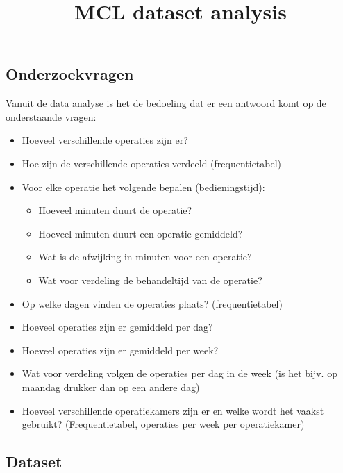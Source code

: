 \documentclass[11pt]{article}
\title{MCL dataset analysis}
\providecommand{\tightlist}{%
      \setlength{\itemsep}{0pt}\setlength{\parskip}{0pt}}
\begin{document}
    
    
    \maketitle
    
    

    
    \hypertarget{onderzoekvragen}{%
\subsection{Onderzoekvragen}\label{onderzoekvragen}}

Vanuit de data analyse is het de bedoeling dat er een antwoord komt op
de onderstaande vragen:

\begin{itemize}
\tightlist
\item
  Hoeveel verschillende operaties zijn er?
\item
  Hoe zijn de verschillende operaties verdeeld (frequentietabel)
\item
  Voor elke operatie het volgende bepalen (bedieningstijd):

  \begin{itemize}
  \tightlist
  \item
    Hoeveel minuten duurt de operatie?
  \item
    Hoeveel minuten duurt een operatie gemiddeld?
  \item
    Wat is de afwijking in minuten voor een operatie?
  \item
    Wat voor verdeling de behandeltijd van de operatie?
  \end{itemize}
\item
  Op welke dagen vinden de operaties plaats? (frequentietabel)
\item
  Hoeveel operaties zijn er gemiddeld per dag?
\item
  Hoeveel operaties zijn er gemiddeld per week?
\item
  Wat voor verdeling volgen de operaties per dag in de week (is het
  bijv. op maandag drukker dan op een andere dag)
\item
  Hoeveel verschillende operatiekamers zijn er en welke wordt het vaakst
  gebruikt? (Frequentietabel, operaties per week per operatiekamer)
\end{itemize}

    \hypertarget{dataset}{%
\subsection{Dataset}\label{dataset}}
\end{document}
